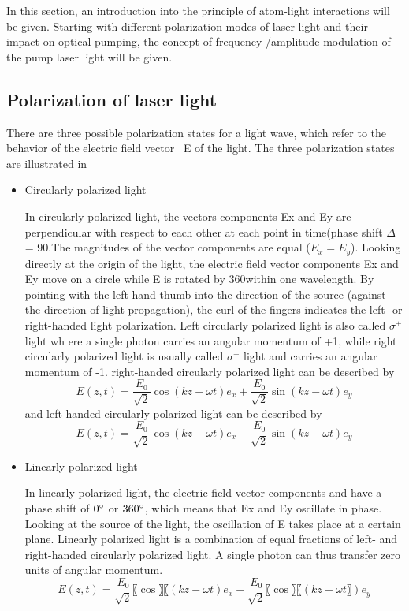 \documentclass[12pt]{report}
\begin{document}
In this section, an introduction into the principle of atom-light interactions will be given. Starting with different polarization modes of laser light and their impact on optical pumping, the concept of frequency /amplitude modulation of the pump laser light will be given.

\subsection{Polarization of laser light} 
There are three possible polarization states for a light wave, which refer to the behavior of the electric field vector ~E of the light. The three polarization states are illustrated in

\begin{itemize}
\item Circularly polarized light

In circularly polarized light, the vectors components Ex and Ey are perpendicular with respect to each other at each point in time(phase shift $\Delta$ = 90\degree.The magnitudes of the vector components are equal ($E_x = E_y$). Looking directly at the origin of the light, the electric field vector components Ex and Ey move on a circle while E is rotated by 360\degree within one wavelength. By pointing with the left-hand thumb into the direction of the source (against the direction of light propagation), the curl of the fingers indicates the left- or right-handed light polarization. Left circularly polarized light is also called $ \sigma^+$ light wh
ere a single photon carries an angular momentum of +1, while right circularly polarized light is usually called $\sigma^-$ light and carries an angular momentum of -1.
\medskip
right-handed circularly polarized light can be described by
\begin{equation}
     E(z,t)=\frac{E_0}{\sqrt{2}} \cos⁡(kz-\omega t)e_x+\frac{E_0}{\sqrt{2}}  \sin ⁡(kz-\omega t)e_y
\end{equation}
and left-handed circularly polarized light can be described by
\begin{equation}
     E(z,t)=\frac{E_0}{\sqrt{2}} \cos⁡(kz-\omega t)e_x-\frac{E_0}{\sqrt{2}} \sin⁡ (kz-\omega t)e_y
\end{equation}
\end{itemize}
\begin{itemize}
\item Linearly polarized light

In linearly polarized light, the electric field vector components  and  have a phase shift of $0 \degree$ or $360\degree$, which means that Ex and Ey oscillate in phase. Looking at the source of the light, the oscillation of E takes place at a certain plane. Linearly polarized light is a combination of equal fractions of left- and right-handed circularly polarized light. A single photon can thus transfer zero units of angular momentum. 
\begin{equation}
     E(z,t)=\frac{E_0}{\sqrt{2}}〖\cos〗⁡〖(kz-\omega t)e_x-\frac{E_0}{\sqrt{2}}〖\cos〗⁡〖(kz-\omega t〗)e_y
\end{equation}
\end{itemize}
\end{document}
